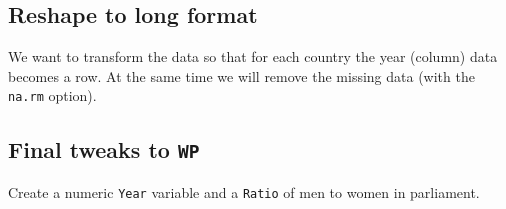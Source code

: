 \documentclass[a4paper,9pt,twocolumn,twoside,printwatermark=true]{pinp}
\begin{document}
\subsection{Reshape to long format}\label{reshape-to-long-format}

We want to transform the data so that for each country the year (column)
data becomes a row. At the same time we will remove the missing data
(with the \texttt{na.rm} option).

\begin{Shaded}
\begin{Highlighting}[]
\StringTok{ }
            \NormalTok{(}\NormalTok{, }\NormalTok{),}
            \NormalTok{(}\NormalTok{),}
            \NormalTok{,}
            \NormalTok{(}\NormalTok{),}
            \NormalTok{)}
\CommentTok{#    ---                               }
\end{Highlighting}
\end{Shaded}

\subsection{\texorpdfstring{Final tweaks to
\texttt{WP}}{Final tweaks to WP}}\label{final-tweaks-to-wp}

Create a numeric \texttt{Year} variable and a \texttt{Ratio} of men to
women in parliament.
\end{document}
